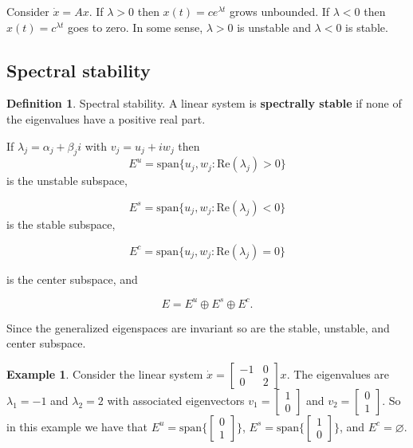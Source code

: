 \documentclass[12pt]{article}
\theoremstyle{definition}
\newtheorem*{definition}{Definition}
\newtheorem*{example}{Example}
\begin{document}
Consider $\dot x = Ax$. If $\lambda > 0$ then $x(t) = c e^{\lambda t}$ grows unbounded. If $\lambda < 0$ then
$x(t) = c^{\lambda t}$ goes to zero. In some sense, $\lambda > 0$ is unstable and $\lambda < 0$ is stable.

\subsection{Spectral stability}

\begin{definition} Spectral stability.
A linear system is \textbf{spectrally stable} if none of the eigenvalues have a positive real part.
\end{definition}

If $\lambda_j = \alpha_j + \beta_j i$ with $v_j = u_j + i w_j$ then
\[
E^u = \text{span} \{u_j, w_j : \text{Re}(\lambda_j) > 0 \}
\]
is the unstable subspace,

\[
E^s = \text{span}\{u_j, w_j : \text{Re}(\lambda_j) < 0 \}
\] 
is the stable subspace,

\[
E^c = \text{span}\{u_j, w_j : \text{Re}(\lambda_j) = 0 \}
\]

is the center subspace, and

\[
E = E^u \oplus E^s \oplus E^c.
\]

Since the generalized eigenspaces are invariant so are the stable, unstable, and center subspace.

\begin{example}
Consider the linear system $\dot x = \begin{bmatrix} -1 & 0 \\ 0 & 2 \end{bmatrix} x$. The eigenvalues are
$\lambda_1 = -1$ and $\lambda_2 = 2$ with associated eigenvectors $v_1 = \begin{bmatrix} 1 \\ 0 \end{bmatrix}$
and $v_2 = \begin{bmatrix} 0 \\ 1 \end{bmatrix}$. So in this example we have that 
$E^u = \text{span}\{\begin{bmatrix} 0 \\ 1 \end{bmatrix} \}$, 
$E^s = \text{span} \{ \begin{bmatrix} 1 \\ 0 \end{bmatrix} \}$, and $E^c = \varnothing$.
\end{example}
\end{document}
